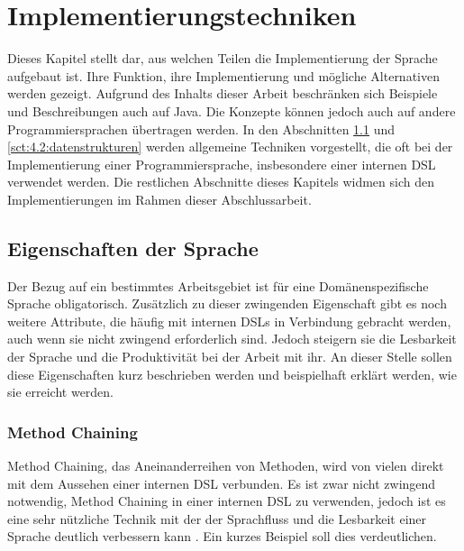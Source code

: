 
\chapter{Implementierungstechniken}\label{chp:4:implementierungstechniken}
Dieses Kapitel stellt dar, aus welchen Teilen die Implementierung der Sprache aufgebaut ist. Ihre Funktion, ihre Implementierung und mögliche Alternativen werden gezeigt. Aufgrund des Inhalts dieser Arbeit beschränken sich Beispiele und Beschreibungen auch auf Java. Die Konzepte können jedoch auch auf andere Programmiersprachen übertragen werden. In den Abschnitten \ref{sct:4.1:eigenschaften} und \ref{sct:4.2:datenstrukturen} werden allgemeine Techniken vorgestellt, die oft bei der Implementierung einer Programmiersprache, insbesondere einer internen DSL verwendet werden. Die restlichen Abschnitte dieses Kapitels widmen sich den Implementierungen im Rahmen dieser Abschlussarbeit.

\section{Eigenschaften der Sprache}\label{sct:4.1:eigenschaften}
Der Bezug auf ein bestimmtes Arbeitsgebiet ist für eine Domänenspezifische Sprache obligatorisch. Zusätzlich zu dieser zwingenden Eigenschaft gibt es noch weitere Attribute, die häufig mit internen DSLs in Verbindung gebracht werden, auch wenn sie nicht zwingend erforderlich sind. Jedoch steigern sie die Lesbarkeit der Sprache und die Produktivität bei der Arbeit mit ihr. An dieser Stelle sollen diese Eigenschaften kurz beschrieben werden und beispielhaft erklärt werden, wie sie erreicht werden.

\subsection{Method Chaining}\label{ssct:4.1.1:chaining}
Method Chaining, das Aneinanderreihen von Methoden, wird von vielen direkt mit dem Aussehen einer internen DSL verbunden. Es ist zwar nicht zwingend notwendig, Method Chaining in einer internen DSL zu verwenden, jedoch ist es eine sehr nützliche Technik mit der der Sprachfluss und die Lesbarkeit einer Sprache deutlich verbessern kann \cite{book:fowlerDSL}. Ein kurzes Beispiel soll dies verdeutlichen.

